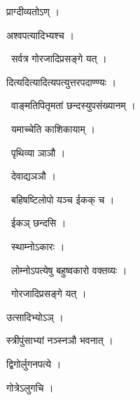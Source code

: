 \documentclass[10pt, openany, oneside]{book}
\begin{document}
\noindent प्राग्दीव्यतोऽण् ।

\noindent अश्वपत्यादिभ्यश्च ।

\par\noindent\hspace{1.5em}{\vps वा॰}~{\qt सर्वत्र गोरजादिप्रसङ्गे यत् ।}

\noindent दित्यदित्यादित्यपत्युत्तरपदाण्ण्यः ।

\par\noindent\hspace{1.5em}{\vps वा॰}~{\qt वाङ्मतिपितृमतां छन्दस्युपसंख्यानम् ।}

\par\noindent\hspace{1.5em}{\vps वा॰}~{\qt यमाच्चेति काशिकायाम् ।}

\par\noindent\hspace{1.5em}{\vps वा॰}~{\qt पृथिव्या ञाञौ ।}

\par\noindent\hspace{1.5em}{\vps वा॰}~{\qt देवाद्यञञौ ।}

\par\noindent\hspace{1.5em}{\vps वा॰}~{\qt बहिषष्टिलोपो यञ्च ईकक् च ।}

\par\noindent\hspace{1.5em}{\vps वा॰}~{\qt ईकञ् छन्दसि ।}

\par\noindent\hspace{1.5em}{\vps वा॰}~{\qt स्थाम्नोऽकारः ।}

\par\noindent\hspace{1.5em}{\vps वा॰}~{\qt लोम्नोऽपत्येषु बहुष्वकारो वक्तव्यः ।}

\par\noindent\hspace{1.5em}{\vps वा॰}~{\qt गोरजादिप्रसङ्गे यत् ।}

\noindent उत्सादिभ्योऽञ् ।

\noindent स्त्रीपुंसाभ्यां नञ्स्नञौ भवनात् ।

\noindent द्विगोर्लुगनपत्ये ।

\noindent गोत्रेऽलुगचि ।
\end{document}
